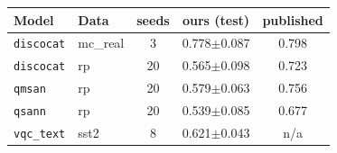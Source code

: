 \begin{tabular}{llccc}
\toprule
Model & Data & seeds & ours (test) & published \\
\midrule
\texttt{discocat} & mc\_real & 3 & 0.778$\pm$0.087 & 0.798 \\
\texttt{discocat} & rp & 20 & 0.565$\pm$0.098 & 0.723 \\
\texttt{qmsan} & rp & 20 & 0.579$\pm$0.063 & 0.756 \\
\texttt{qsann} & rp & 20 & 0.539$\pm$0.085 & 0.677 \\
\texttt{vqc\_text} & sst2 & 8 & 0.621$\pm$0.043 & n/a \\
\bottomrule
\end{tabular}
